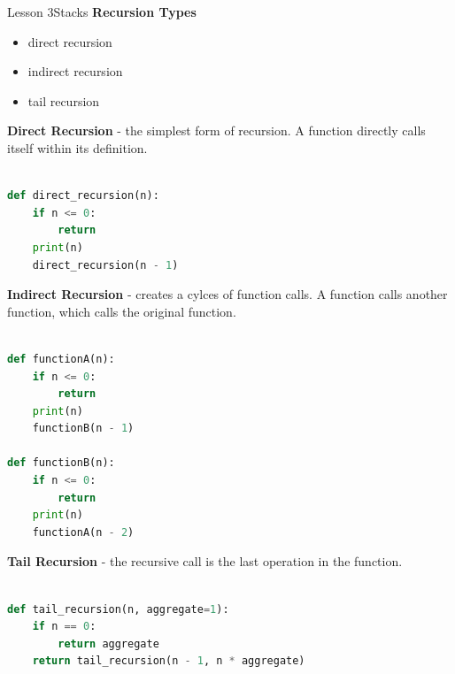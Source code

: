 \documentclass[aspectratio=1610]{beamer}
\begin{document}
\begin{frame}{Lesson 3}{Stacks}
\LARGE
\textbf{Recursion Types}\\
\begin{itemize}
    \item direct recursion
    \item indirect recursion
    \item tail recursion 
\end{itemize}
\end{frame}



\begin{frame}[fragile]
\Large
\textbf{Direct Recursion} - the simplest form of recursion. A function directly calls itself within its definition. \\~\\
\begin{lstlisting}[language=Python]
def direct_recursion(n):
    if n <= 0:
        return
    print(n)
    direct_recursion(n - 1)
 \end{lstlisting}
\end{frame} 



\begin{frame}[fragile]
\Large
\textbf{Indirect Recursion} - creates a cylces of function calls. A function calls another function, which calls the original function.\\~\\
\begin{lstlisting}[language=Python]
def functionA(n):
    if n <= 0:
        return
    print(n)
    functionB(n - 1)

def functionB(n):
    if n <= 0:
        return
    print(n)
    functionA(n - 2)
 \end{lstlisting}
\end{frame} 

    
\begin{frame}[fragile]
\Large
\textbf{Tail Recursion} - the recursive call is the last operation in the function.\\~\\
\begin{lstlisting}[language=Python]
def tail_recursion(n, aggregate=1):
    if n == 0:
        return aggregate
    return tail_recursion(n - 1, n * aggregate)
 \end{lstlisting}
\end{frame} 
\end{document}
